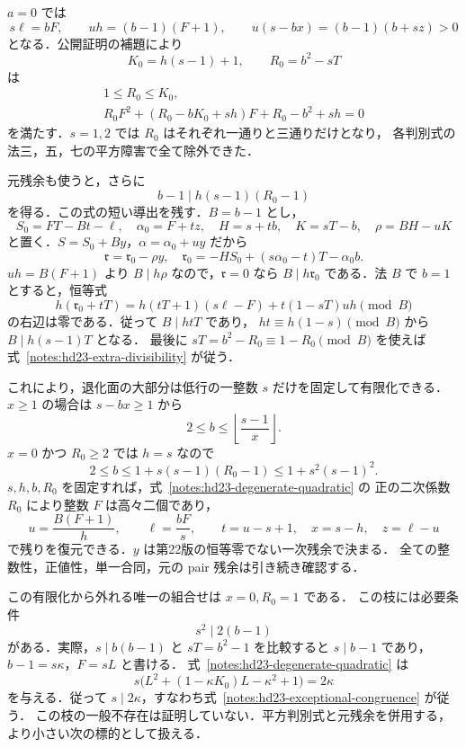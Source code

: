 $a=0$ では
\[
 s\ell=bF,\qquad uh=(b-1)(F+1),\qquad
 u(s-bx)=(b-1)(b+sz)>0
\]
となる．公開証明の補題により
\[
 K_0=h(s-1)+1,\qquad R_0=b^2-sT
\]
は
\begin{equation}\label{notes:hd23-degenerate-quadratic}
 \begin{gathered}
 1\le R_0\le K_0,\\
 R_0F^2+(R_0-bK_0+sh)F+R_0-b^2+sh=0
 \end{gathered}
\end{equation}
を満たす．$s=1,2$ では $R_0$ はそれぞれ一通りと三通りだけとなり，
各判別式の法三，五，七の平方障害で全て除外できた．

元残余も使うと，さらに
\begin{equation}\label{notes:hd23-extra-divisibility}
 \boxed{\ b-1\mid h(s-1)(R_0-1)\ }
\end{equation}
を得る．この式の短い導出を残す．$B=b-1$ とし，
\[
 S_0=FT-Bt-\ell,\quad \alpha_0=F+tz,\quad
 H=s+tb,\quad K=sT-b,\quad \rho=BH-uK
\]
と置く．$S=S_0+By$，$\alpha=\alpha_0+uy$ だから
\[
 \mathfrak r=\mathfrak r_0-\rho y,
 \quad
 \mathfrak r_0=-HS_0+(s\alpha_0-t)T-\alpha_0b.
\]
$uh=B(F+1)$ より $B\mid h\rho$ なので，$\mathfrak r=0$ なら
$B\mid h\mathfrak r_0$ である．法 $B$ で $b=1$ とすると，恒等式
\[
 h(\mathfrak r_0+tT)
 =h(tT+1)(s\ell-F)+t(1-sT)uh
 \pmod B
\]
の右辺は零である．従って $B\mid htT$ であり，
$ht\equiv h(1-s)\pmod B$ から $B\mid h(s-1)T$ となる．
最後に $sT=b^2-R_0\equiv1-R_0\pmod B$ を使えば
式~\eqref{notes:hd23-extra-divisibility} が従う．

これにより，退化面の大部分は低行の一整数 $s$ だけを固定して有限化できる．
$x\ge1$ の場合は $s-bx\ge1$ から
\[
 2\le b\le\left\lfloor\frac{s-1}{x}\right\rfloor.
\]
$x=0$ かつ $R_0\ge2$ では $h=s$ なので
\[
 2\le b\le1+s(s-1)(R_0-1)\le1+s^2(s-1)^2.
\]
$s,h,b,R_0$ を固定すれば，式~\eqref{notes:hd23-degenerate-quadratic} の
正の二次係数 $R_0$ により整数 $F$ は高々二個であり，
\[
 u=\frac{B(F+1)}h,\qquad \ell=\frac{bF}s,\qquad
 t=u-s+1,\quad x=s-h,\quad z=\ell-u
\]
で残りを復元できる．$y$ は第22版の恒等零でない一次残余で決まる．
全ての整数性，正値性，単一合同，元の pair 残余は引き続き確認する．

この有限化から外れる唯一の組合せは $x=0,R_0=1$ である．
この枝には必要条件
\begin{equation}\label{notes:hd23-exceptional-congruence}
 s^2\mid2(b-1)
\end{equation}
がある．実際，$s\mid b(b-1)$ と $sT=b^2-1$ を比較すると $s\mid b-1$ であり，
$b-1=s\kappa$，$F=sL$ と書ける．
式~\eqref{notes:hd23-degenerate-quadratic} は
\[
 s\bigl(L^2+(1-\kappa K_0)L-\kappa^2+1\bigr)=2\kappa
\]
を与える．従って $s\mid2\kappa$，すなわち式~\eqref{notes:hd23-exceptional-congruence} が従う．
この枝の一般不存在は証明していない．平方判別式と元残余を併用する，
より小さい次の標的として扱える．

